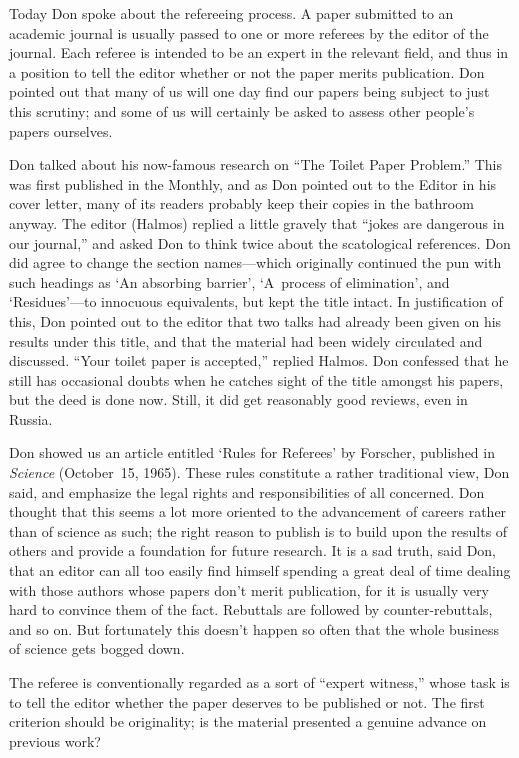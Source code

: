 Today Don spoke about the refereeing process. A paper submitted to an
academic journal is usually passed to one or more
referees by the editor of the
journal. Each referee is intended to be an expert in the relevant
field, and thus in a position to tell the editor whether or not the
paper merits publication. Don pointed out that many of us will one day
find our papers being subject to just this scrutiny; and some of us
will certainly be asked to assess other people's papers ourselves.

Don talked about his now-famous research on ``The Toilet Paper Problem.''
This was first published in the {\sc Monthly},  and
as Don pointed out to the Editor in his cover letter, many of its
readers probably keep their copies in the bathroom anyway. The editor (Halmos)
replied a little gravely that ``jokes are dangerous in our journal,''
and asked Don to think twice about
 the scatological references. Don did agree to
change the section names---which originally continued the pun with
such headings as `An absorbing barrier',
`A~process of elimination', and `Residues'---to
innocuous equivalents, but kept the title intact. In justification of
this, Don pointed out to the editor that two talks had already been
given on his results under this title, and that the material had been
widely circulated and discussed. ``Your toilet paper is accepted,''
replied Halmos. Don confessed that he still has occasional doubts
when he catches sight of the title amongst his papers, but the deed is
done now. Still, it did get reasonably good reviews, even in Russia.

Don showed us an article entitled `Rules for Referees' by Forscher,
published in {\sl Science\/} (October~15, 1965).
 These rules constitute a rather traditional
view, Don said, and emphasize the legal rights and responsibilities of
all concerned. Don thought that this seems a lot more oriented to the
advancement of careers rather than of science as such; the right
reason to publish is to build upon the results of others and provide a
foundation for future research. It is a sad truth, said Don, that an
editor can all too easily find himself spending a great deal of time
dealing with those authors whose papers don't merit publication, for
it is usually very hard to convince them of the fact. Rebuttals are
followed by counter-rebuttals, and so on. But fortunately this doesn't
happen so often that the whole business of science gets bogged down.

The referee is conventionally regarded as a sort of ``expert witness,''
whose task is to tell the editor whether the paper deserves to be
published or not. The first criterion should be originality;
is the material presented a genuine advance on previous work?

